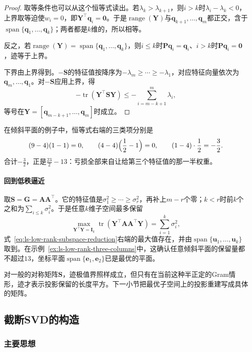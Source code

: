 \begin{proof}
取等条件也可以从这个恒等式读出。若$\lambda_k>\lambda_{k+1}$，则$i>k$时$\lambda_i-\lambda_k<0$，上界取等迫使$w_i=0$，即$\bm Y^\top\bm q_i=\bm0$。于是$\operatorname{range}(\bm Y)$与$\bm q_{k+1},\ldots,\bm q_m$都正交，含于$\operatorname{span}\{\bm q_1,\ldots,\bm q_k\}$；两者都是$k$维的，所以相等。

反之，若$\operatorname{range}(\bm Y)=\operatorname{span}\{\bm q_1,\ldots,\bm q_k\}$，则$i\leq k$时$\bm P\bm q_i=\bm q_i$、$i>k$时$\bm P\bm q_i=\bm0$，迹等于上界。

下界由上界得到。$-\bm S$的特征值按降序为$-\lambda_m\geq\cdots\geq-\lambda_1$，对应特征向量依次为$\bm q_m,\ldots,\bm q_1$。对$-\bm S$应用上界，得
\[
 -\operatorname{tr}(\bm Y^\top\bm S\bm Y)\leq-\sum_{i=m-k+1}^m\lambda_i ,
\]
等号在$\bm Y=[\bm q_{m-k+1},\ldots,\bm q_m]$时成立。
\end{proof}

在倾斜平面的例子中，恒等式右端的三类项分别是
\[
 (9-4)(1-1)=0,\qquad (4-4)\Bigl(\frac12-1\Bigr)=0,\qquad (1-4)\cdot\frac12=-\frac32 .
\]
合计$-\tfrac32$，正是$\tfrac{23}2-13$：亏损全部来自让给第三个特征值的那一半权重。

\paragraph{回到低秩逼近}
取$\bm S=\bm G=\bm A\bm A^\top$。它的特征值是$\sigma_1^2\geq\cdots\geq\sigma_r^2$，再补上$m-r$个零；$k<r$时前$k$个之和为$\sum_{i\leq k}\sigma_i^2$。于是任意$k$维子空间最多保留
\begin{equation}
 \max_{\bm Y^\top\bm Y=\bm I_k}\operatorname{tr}(\bm Y^\top\bm A\bm A^\top\bm Y)=\sum_{i=1}^k\sigma_i^2 ,
 \label{eq:ls-low-rank-max-retained}
\end{equation}
式~\eqref{eq:ls-low-rank-subspace-reduction}右端的最大值存在，并由$\operatorname{span}\{\bm u_1,\ldots,\bm u_k\}$取到。在示例~\ref{ex:ls-low-rank-three-columns}中，这确认任意倾斜平面的保留量都不超过$13$，坐标平面$\operatorname{span}\{\bm e_1,\bm e_2\}$已是最优的平面。

对一般的对称矩阵$\bm S$，迹极值界照样成立，但只有在当前这种半正定的Gram情形，迹才表示投影保留的长度平方。下一小节把最优子空间上的投影重建写成具体的矩阵。

\subsection{截断SVD的构造}
\label{sec:ls-truncated-svd-construction}

\subsubsection{主要思想}

